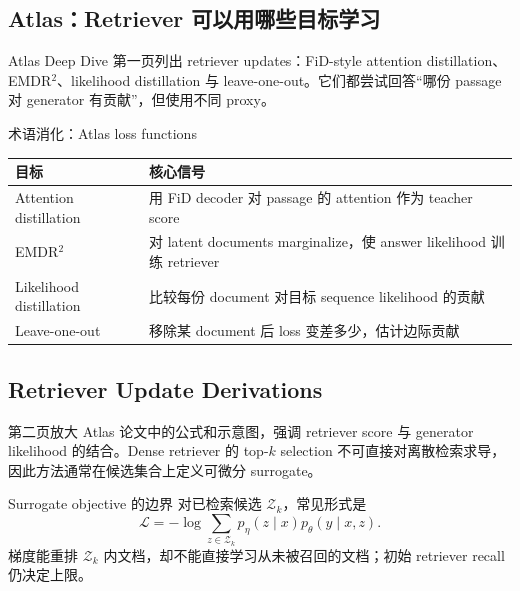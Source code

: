 \subsection{Atlas：Retriever 可以用哪些目标学习}

Atlas Deep Dive 第一页列出 retriever updates：FiD-style attention distillation、EMDR$^2$、likelihood distillation 与 leave-one-out。它们都尝试回答“哪份 passage 对 generator 有贡献”，但使用不同 proxy。


\begin{knowledgebox}{术语消化：Atlas loss functions}
\begin{tabularx}{\textwidth}{L{0.22\textwidth}>{\raggedright\arraybackslash}X}
\toprule
目标 & 核心信号 \\
\midrule
Attention distillation & 用 FiD decoder 对 passage 的 attention 作为 teacher score \\
EMDR$^2$ & 对 latent documents marginalize，使 answer likelihood 训练 retriever \\
Likelihood distillation & 比较每份 document 对目标 sequence likelihood 的贡献 \\
Leave-one-out & 移除某 document 后 loss 变差多少，估计边际贡献 \\
\bottomrule
\end{tabularx}
\end{knowledgebox}

\subsection{Retriever Update Derivations}

第二页放大 Atlas 论文中的公式和示意图，强调 retriever score 与 generator likelihood 的结合。Dense retriever 的 top-$k$ selection 不可直接对离散检索求导，因此方法通常在候选集合上定义可微分 surrogate。


\begin{importantbox}{Surrogate objective 的边界}
对已检索候选 $\mathcal{Z}_k$，常见形式是
\[
\mathcal{L}=-\log\sum_{z\in\mathcal{Z}_k}
p_\eta(z\mid x)p_\theta(y\mid x,z).
\]
梯度能重排 $\mathcal{Z}_k$ 内文档，却不能直接学习从未被召回的文档；初始 retriever recall 仍决定上限。
\end{importantbox}

